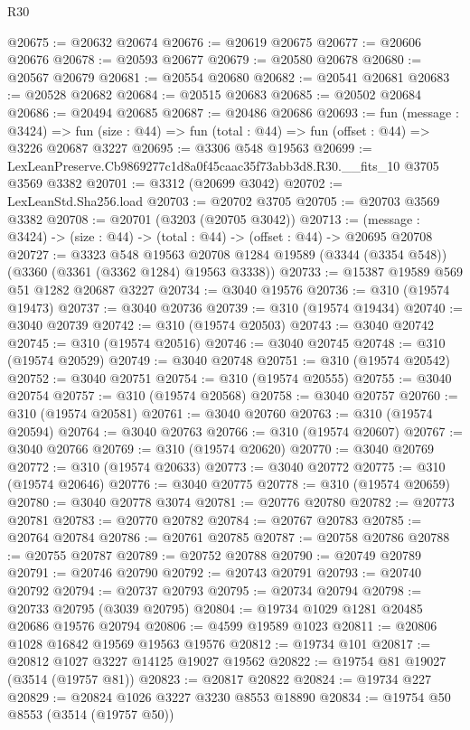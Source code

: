 \begin{lexlean}{R30}
\begin{coremodule}
@20675 := @20632 @20674
@20676 := @20619 @20675
@20677 := @20606 @20676
@20678 := @20593 @20677
@20679 := @20580 @20678
@20680 := @20567 @20679
@20681 := @20554 @20680
@20682 := @20541 @20681
@20683 := @20528 @20682
@20684 := @20515 @20683
@20685 := @20502 @20684
@20686 := @20494 @20685
@20687 := @20486 @20686
@20693 := fun (message : @3424) =>
  fun (size : @44) => fun (total : @44) => fun (offset : @44) => @3226 @20687 @3227
@20695 := @3306 @548 @19563
@20699 := LexLeanPreserve.Cb9869277c1d8a0f45caac35f73abb3d8.R30.__fits_10 @3705 @3569 @3382
@20701 := @3312 (@20699 @3042)
@20702 := LexLeanStd.Sha256.load
@20703 := @20702 @3705
@20705 := @20703 @3569 @3382
@20708 := @20701 (@3203 (@20705 @3042))
@20713 := (message : @3424) -> (size : @44) -> (total : @44) -> (offset : @44) -> @20695 @20708
@20727 := @3323
    @548
    @19563
    @20708
    @1284
    @19589
    (@3344 (@3354 @548))
    (@3360 (@3361 (@3362 @1284) @19563 @3338))
@20733 := @15387 @19589 @569 @51 @1282 @20687 @3227
@20734 := @3040 @19576
@20736 := @310 (@19574 @19473)
@20737 := @3040 @20736
@20739 := @310 (@19574 @19434)
@20740 := @3040 @20739
@20742 := @310 (@19574 @20503)
@20743 := @3040 @20742
@20745 := @310 (@19574 @20516)
@20746 := @3040 @20745
@20748 := @310 (@19574 @20529)
@20749 := @3040 @20748
@20751 := @310 (@19574 @20542)
@20752 := @3040 @20751
@20754 := @310 (@19574 @20555)
@20755 := @3040 @20754
@20757 := @310 (@19574 @20568)
@20758 := @3040 @20757
@20760 := @310 (@19574 @20581)
@20761 := @3040 @20760
@20763 := @310 (@19574 @20594)
@20764 := @3040 @20763
@20766 := @310 (@19574 @20607)
@20767 := @3040 @20766
@20769 := @310 (@19574 @20620)
@20770 := @3040 @20769
@20772 := @310 (@19574 @20633)
@20773 := @3040 @20772
@20775 := @310 (@19574 @20646)
@20776 := @3040 @20775
@20778 := @310 (@19574 @20659)
@20780 := @3040 @20778 @3074
@20781 := @20776 @20780
@20782 := @20773 @20781
@20783 := @20770 @20782
@20784 := @20767 @20783
@20785 := @20764 @20784
@20786 := @20761 @20785
@20787 := @20758 @20786
@20788 := @20755 @20787
@20789 := @20752 @20788
@20790 := @20749 @20789
@20791 := @20746 @20790
@20792 := @20743 @20791
@20793 := @20740 @20792
@20794 := @20737 @20793
@20795 := @20734 @20794
@20798 := @20733 @20795 (@3039 @20795)
@20804 := @19734 @1029 @1281 @20485 @20686 @19576 @20794
@20806 := @4599 @19589 @1023
@20811 := @20806 @1028 @16842 @19569 @19563 @19576
@20812 := @19734 @101
@20817 := @20812 @1027 @3227 @14125 @19027 @19562
@20822 := @19754 @81 @19027 (@3514 (@19757 @81))
@20823 := @20817 @20822
@20824 := @19734 @227
@20829 := @20824 @1026 @3227 @3230 @8553 @18890
@20834 := @19754 @50 @8553 (@3514 (@19757 @50))

\end{coremodule}
\end{lexlean}
